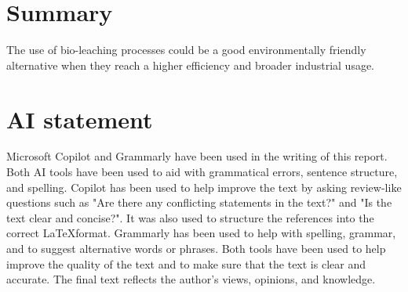 \section{Summary}

The use of bio-leaching processes could be a good environmentally friendly alternative when they reach a higher efficiency and broader industrial usage.

\section{AI statement}

Microsoft Copilot and Grammarly have been used in the writing of this report. Both AI tools have been used to aid with grammatical errors, sentence structure, and spelling. Copilot has been used to help improve the text by asking review-like questions such as "Are there any conflicting statements in the text?" and "Is the text clear and concise?". It was also used to structure the references into the correct \LaTeX format. Grammarly has been used to help with spelling, grammar, and to suggest alternative words or phrases. Both tools have been used to help improve the quality of the text and to make sure that the text is clear and accurate. The final text reflects the author's views, opinions, and knowledge.

